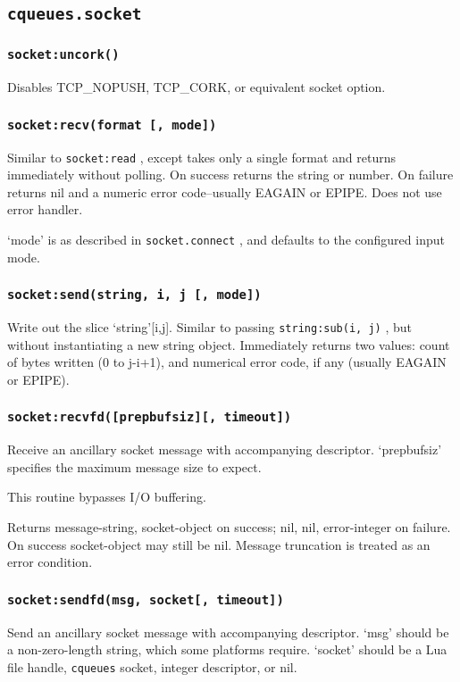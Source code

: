 \documentclass[11pt, oneside]{memoir}
\newcommand{\cqueues}[0]{\texttt{cqueues} }
\newcommand{\fn}[1]{\texttt{#1} }
\newcommand{\method}[1]{\texttt{#1} }
\newcounter{toccols}
\newenvironment{Module}[1]{
	\subsection{\texttt{#1}}
	\addtocontents{toc}{
		\protect\begin{multicols}{\value{toccols}}
	}
}{
	\addtocontents{toc}{\protect\end{multicols}}
}
\begin{document}
\begin{Module}{cqueues.socket}
\subsubsection[\fn{socket:uncork}]{\fn{socket:uncork()}}
Disables TCP\_NOPUSH, TCP\_CORK, or equivalent socket option.

\subsubsection[\fn{socket:recv}]{\fn{socket:recv(format [, mode])}}
Similar to \method{socket:read}, except takes only a single format and returns immediately without polling. On success returns the string or number. On failure returns nil and a numeric error code--usually EAGAIN or EPIPE. Does not use error handler.

`mode' is as described in \fn{socket.connect}, and defaults to the configured input mode.

\subsubsection[\fn{socket:send}]{\fn{socket:send(string, i, j [, mode])}}
Write out the slice `string'[i,j]. Similar to passing \fn{string:sub(i, j)}, but without instantiating a new string object. Immediately returns two values: count of bytes written (0 to j-i+1), and numerical error code, if any (usually EAGAIN or EPIPE).

\subsubsection[\fn{socket:recvfd}]{\fn{socket:recvfd([prepbufsiz][, timeout])}}
Receive an ancillary socket message with accompanying descriptor. `prepbufsiz' specifies the maximum message size to expect.

This routine bypasses I/O buffering.

Returns message-string, socket-object on success; nil, nil, error-integer on failure. On success socket-object may still be nil. Message truncation is treated as an error condition.

\subsubsection[\fn{socket:sendfd}]{\fn{socket:sendfd(msg, socket[, timeout])}}
Send an ancillary socket message with accompanying descriptor. `msg' should be a non-zero-length string, which some platforms require. `socket' should be a Lua file handle, \cqueues socket, integer descriptor, or nil.


\end{Module}
\end{document}
